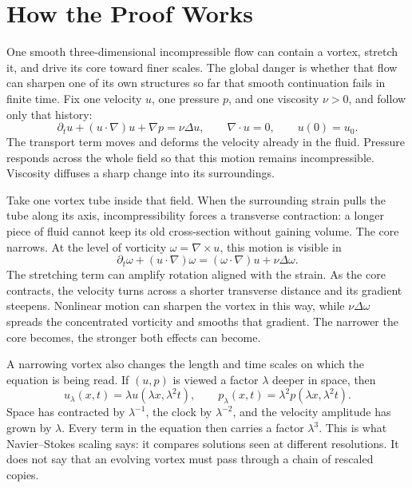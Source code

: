 \begingroup
\setlength{\parindent}{0pt}
\setlength{\parskip}{0.40\baselineskip}
\setlength{\abovedisplayskip}{6.5pt plus 1.5pt minus 1.5pt}
\setlength{\belowdisplayskip}{6.5pt plus 1.5pt minus 1.5pt}
\setlength{\jot}{4.5pt}

\section*{How the Proof Works}

One smooth three-dimensional incompressible flow can contain a vortex, stretch
it, and drive its core toward finer scales.  The global danger is whether that
flow can sharpen one of its own structures so far that smooth continuation
fails in finite time.  Fix one velocity \(u\), one pressure \(p\), and one
viscosity \(\nu>0\), and follow only that history:
\[
 \partial_tu+(u\!\cdot\nabla)u+\nabla p=\nu\Delta u,
 \qquad \nabla\!\cdot u=0,
 \qquad u(0)=u_0.
\]
The transport term moves and deforms the velocity already in the fluid.
Pressure responds across the whole field so that this motion remains
incompressible.  Viscosity diffuses a sharp change into its surroundings.

Take one vortex tube inside that field.  When the surrounding strain pulls the
tube along its axis, incompressibility forces a transverse contraction: a
longer piece of fluid cannot keep its old cross-section without gaining
volume.  The core narrows.  At the level of vorticity
\(\omega=\nabla\times u\), this motion is visible in
\[
 \partial_t\omega+(u\!\cdot\nabla)\omega
 = (\omega\!\cdot\nabla)u+\nu\Delta\omega.
\]
The stretching term can amplify rotation aligned with the strain.  As the
core contracts, the velocity turns across a shorter transverse distance and
its gradient steepens.  Nonlinear motion can sharpen the vortex in this way,
while \(\nu\Delta\omega\) spreads the concentrated vorticity and smooths that
gradient.  The narrower the core becomes, the stronger both effects can
become.

A narrowing vortex also changes the length and time scales on which the
equation is being read.  If \((u,p)\) is viewed a factor \(\lambda\) deeper in
space, then
\[
 u_\lambda(x,t)=\lambda u(\lambda x,\lambda^2t),
 \qquad
 p_\lambda(x,t)=\lambda^2p(\lambda x,\lambda^2t).
\]
Space has contracted by \(\lambda^{-1}\), the clock by \(\lambda^{-2}\), and
the velocity amplitude has grown by \(\lambda\).  Every term in the equation
then carries a factor \(\lambda^3\).  This is what Navier--Stokes scaling says:
it compares solutions seen at different resolutions.  It does not say that an
evolving vortex must pass through a chain of rescaled copies.

